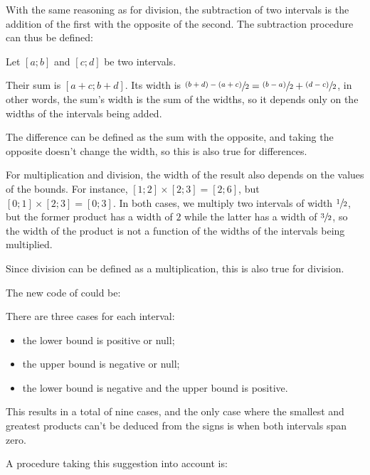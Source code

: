 \begin{exe}[2.8]
    With the same reasoning as for division, the subtraction of two intervals is 
    the addition of the first with the opposite of the second.
    The subtraction procedure can thus be defined:
\end{exe}

\begin{exe}[2.9]
    Let $[a;b]$ and $[c;d]$ be two intervals.

    Their sum is $[a + c; b + d]$. Its width is $\sfrac{(b + d) - (a + c)}{2} 
    = \sfrac{(b - a)}{2} + \sfrac{(d - c)}{2}$, in other words, the sum’s 
    width is the sum of the widths, so it depends only on the widths of the 
    intervals being added.

    The difference can be defined as the sum with the opposite, and taking the 
    opposite doesn’t change the width, so this is also true for differences.

    For multiplication and division, the width of the result also depends on 
    the values of the bounds. For instance, $[1; 2] \times [2; 3] = [2; 6]$, 
    but $[0; 1] \times [2; 3] = [0; 3]$. In both cases, we multiply two 
    intervals of width $\sfrac{1}{2}$, but the former product has a width of 
    $2$ while the latter has a width of $\sfrac{3}{2}$, so the width of the 
    product is not a function of the widths of the intervals being multiplied.

    Since division can be defined as a multiplication, this is also true for 
    division.
\end{exe}

\begin{exe}[2.10]
    The new code of  could be:
\end{exe}

\begin{exe}[2.11]
    There are three cases for each interval:
    \begin{itemize}
        \item the lower bound is positive or null;
        \item the upper bound is negative or null;
        \item the lower bound is negative and the upper bound is positive.
    \end{itemize}
    This results in a total of nine cases, and the only case where the smallest 
    and greatest products can’t be deduced from the signs is when both intervals 
    span zero.

    A procedure taking this suggestion into account is:
\end{exe}

